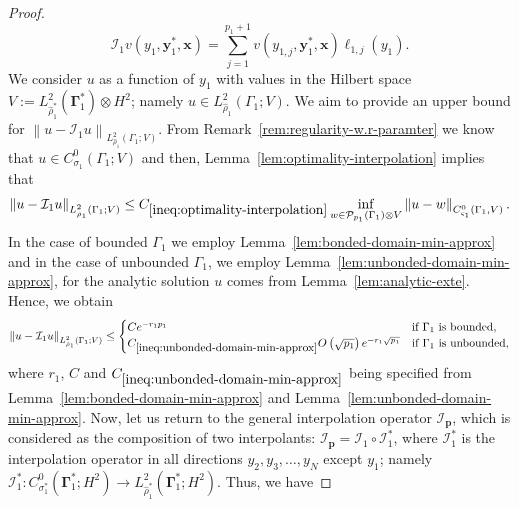 \documentclass[final,onefignum,onetabnum]{mousaviart}
\begin{document}
\begin{proof}
\begin{equation*}
					\mathcal{I}_1 v\left( y_1, \boldsymbol{y}_1^*,\boldsymbol{x} \right)
					=
					\sum_{j=1}^{p_1+1}  
					v\left( y_{1,j}, \boldsymbol{y}_1^*,\boldsymbol{x} \right) 
					\ell_{1,j}(y_1).
				\end{equation*}
				We consider $u$ as a function of $y_1$ with values in the Hilbert space $V:= L_{\hat{\rho}_1^*}^2(\boldsymbol{\Gamma}_1^*) \otimes  H^2$; namely $u \in L_{\hat{\rho}_1}^2\left(\Gamma_1; V \right)$. We aim to provide an upper bound for $\left\| u - \mathcal{I}_1 u \right\|_{L^2_{\hat{\rho}_1}(\Gamma_1; V)} $.
				From Remark~\ref{rem:regularity-w.r-paramter} we know that $u \in C_{\sigma_1}^0(\Gamma_1; V)$ and then, Lemma~\ref{lem:optimality-interpolation} implies that 
				\begin{equation*}
					\left\| u - \mathcal{I}_1 u \right\|_{L^2_{\hat{\rho}_1}(\Gamma_1; V)} 
					\leq
					C_{\ref{ineq:optimality-interpolation}}
					\inf_{w \in \mathcal{P}_{p_1}(\Gamma_1) \otimes V}
					\left\| u - w \right\|_{C_{\varsigma_1}^0(\Gamma_1, V)}
					.
				\end{equation*}
				In the case of bounded $\Gamma_1$ we employ Lemma~\ref{lem:bonded-domain-min-approx} and in the case of unbounded $\Gamma_1$, we employ Lemma~\ref{lem:unbonded-domain-min-approx}, for the analytic solution $u$ comes from Lemma~\ref{lem:analytic-exte}. Hence, we obtain
				\begin{equation}
					\label{ineq:upper-bound-interpolation-1D}
					\left\| u - \mathcal{I}_1 u \right\|_{L_{\hat{\rho}_1}^2(\Gamma_1; V)} 
					\leq
					\begin{cases}
						Ce^{-r_1p_1} & \text{if $\Gamma_1$ is bounded},
						\\
						C_{\ref{ineq:unbonded-domain-min-approx}}O\left(\sqrt{p_1} \right) e^{-r_1\sqrt{p_1}} 
						& \text{if $\Gamma_1$ is unbounded},
					\end{cases}	
				\end{equation}
				where $r_1$, $C$ and $C_{\ref{ineq:unbonded-domain-min-approx}}$ being specified from Lemma~\ref{lem:bonded-domain-min-approx} and Lemma~\ref{lem:unbonded-domain-min-approx}.
				Now, let us return to the general interpolation operator $\mathcal{I}_{\boldsymbol{p}}$, which is considered as the composition of two interpolants: $\mathcal{I}_{\boldsymbol{p}}= \mathcal{I}_1 \circ \mathcal{I}_1^*$, where $\mathcal{I}_1^*$ is the interpolation operator in all directions $y_2,y_3,\dots,y_N$ except $y_1$; namely $\mathcal{I}_1^*: C_{\sigma_{1}^*}^0\left( \boldsymbol{\Gamma}_1^* ;H^2 \right) \rightarrow L_{\hat{\rho}_1^*}^2 \left( \boldsymbol{\Gamma}_1^*; H^2 \right)$. Thus, we have

\end{proof}
\end{document}
